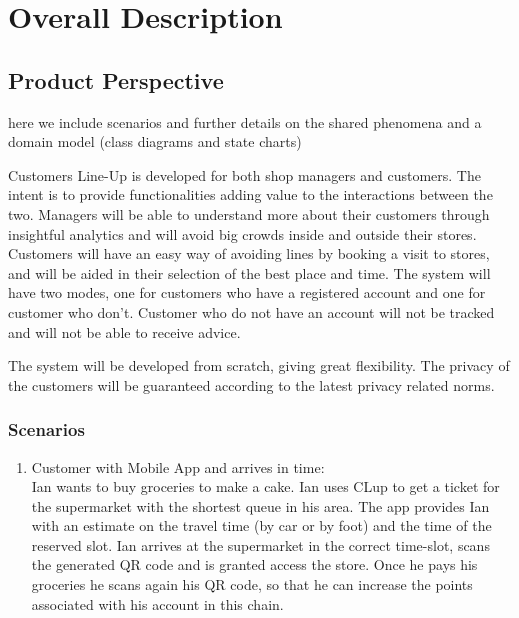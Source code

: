 \section{Overall Description}\label{sec:overall_desc}

\subsection{Product Perspective}

here we include scenarios and further details on the shared
phenomena and a domain model (class diagrams and state charts)

Customers Line-Up is developed for both shop managers and customers.
The intent is to provide functionalities adding value to the interactions between the two.
Managers will be able to understand more about their customers through insightful analytics and will avoid big crowds inside and outside their stores.
Customers will have an easy way of avoiding lines by booking a visit to stores, and will be aided in their selection of the best place and time.
The system will have two modes, one for customers who have a registered account and one for customer who don't.
Customer who do not have an account will not be tracked and will not be able to receive advice.

The system will be developed from scratch, giving great flexibility.
The privacy of the customers will be guaranteed according to the latest privacy related norms.

\subsubsection{Scenarios}
    \begin{enumerate}[label=\Alph*.]
        \item Customer with Mobile App and arrives in time:\\
            Ian wants to buy groceries to make a cake. Ian uses CLup to get a ticket for the supermarket with the shortest queue in his area.
            The app provides Ian with an estimate on the travel time (by car or by foot) and the time of the reserved slot. 
            Ian arrives at the supermarket in the correct time-slot, scans the generated QR code and is granted access the store. Once he pays
            his groceries he scans again his QR code, so that he can increase the points associated with his account in this chain.
    \end{enumerate}






